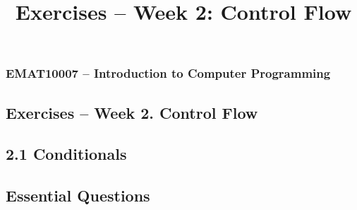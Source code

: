 \documentclass[11pt]{report}
\begin{document}
\title{Exercises -- Week 2: Control Flow}
\subsubsection*{EMAT10007 -- Introduction to Computer Programming}
\subsection*{\Large Exercises -- Week 2. Control Flow}

\subsection*{\Large 2.1 Conditionals}

\subsection*{Essential Questions}
\end{document}
